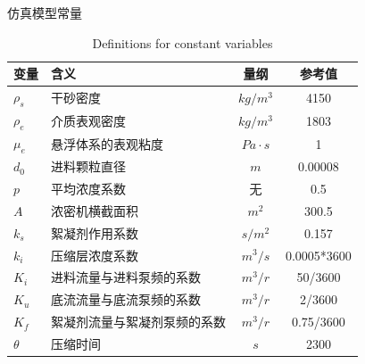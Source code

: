 \begin{table}[!ht]
\caption{仿真模型常量}

    \addtocounter{table}{-1}
    \vspace{-0.2cm}
    \renewcommand{\tablename}{Table}
    \caption{Definitions for constant variables}
    \renewcommand{\tablename}{表}
    \vspace{0.4cm}

\label{tab:const_variable}
\begin{tabular}{@{}lp{3.3cm}cc@{}}
\toprule 变量            & 含义             & 量纲           &
参考值         \\ \midrule
$\rho _s$     & 干砂密度           & $kg/m^3$     & 4150        \\
$\rho _e$     & 介质表观密度         & $kg/m^3$     & 1803        \\
$\mu _ { e }$ & 悬浮体系的表观粘度      & $Pa \cdot s$ & 1           \\
$d_0$         & 进料颗粒直径         & $m$          & 0.00008     \\
$p$           & 平均浓度系数         & 无            & 0.5         \\
$A$           & 浓密机横截面积        & $m^2$        & 300.5       \\
$k_s$         & 絮凝剂作用系数        & $s/m^2$      & 0.157       \\
$k_i$         & 压缩层浓度系数        & $m^3/s$      & 0.0005*3600 \\
$K_i$         & 进料流量与进料泵频的系数   & $m^3/r$      & 50/3600     \\
$K_u$         & 底流流量与底流泵频的系数   & $m^3/r$      & 2/3600      \\
$K_f$         & 絮凝剂流量与絮凝剂泵频的系数 & $m^3/r$      & 0.75/3600   \\
$\theta$      & 压缩时间           & $s$          & 2300        \\
\bottomrule
\end{tabular}
\end{table}
